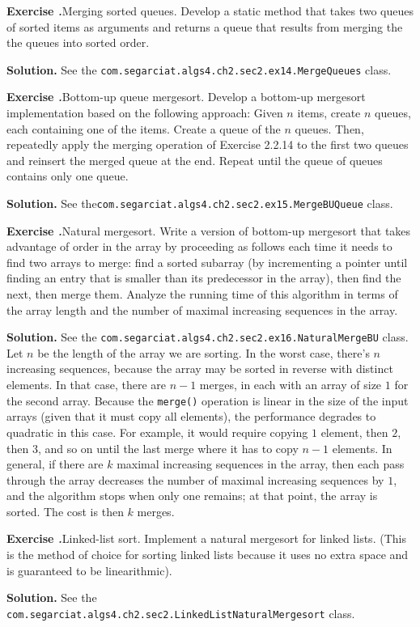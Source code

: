 \documentclass[12pt, a4paper]{article}
\newenvironment{ex}[2][Exercise]
{\par\medskip\noindent \textbf{#1 #2.}}
{\medskip}
\newenvironment{sol}[1][Solution]
{\par\medskip\noindent \textbf{#1.} }
{\medskip}
\begin{document}
	\begin{ex}{14}
		\emph{Merging sorted queues}. Develop a static method that takes two queues of sorted
		items as arguments and returns a queue that results from merging the the queues
		into sorted order.
	\end{ex}
	\begin{sol}
		See the \texttt{com.segarciat.algs4.ch2.sec2.ex14.MergeQueues} class.
	\end{sol}
	\begin{ex}{15}
		\emph{Bottom-up queue mergesort}. Develop a bottom-up mergesort implementation based
		on the following approach: Given $n$ items, create $n$ queues, each containing one
		of the items. Create a queue of the $n$ queues. Then, repeatedly apply the merging
		operation of Exercise 2.2.14 to the first two queues and reinsert the merged queue
		at the end. Repeat until the queue of queues contains only one queue.
	\end{ex}
	\begin{sol}
		See the\texttt{com.segarciat.algs4.ch2.sec2.ex15.MergeBUQueue} class.
	\end{sol}
	\begin{ex}{16}
		\emph{Natural mergesort}. Write a version of bottom-up mergesort that takes advantage
		of order in the array by proceeding as follows each time it needs to find
		two arrays to merge: find a sorted subarray (by incrementing a pointer until
		finding an entry that is smaller than its predecessor in the array), then find
		the next, then merge them. Analyze the running time of this algorithm in terms
		of the array length and the number of maximal increasing sequences in the array.
	\end{ex}
	\begin{sol}
		See the \texttt{com.segarciat.algs4.ch2.sec2.ex16.NaturalMergeBU} class.
		Let $n$ be the length of the array we are sorting. In the worst case,
		there's $n$ increasing sequences, because the array may be sorted in
		reverse with distinct elements. In that case, there are $n-1$ merges,
		in each with an array of size $1$ for the second array.
		Because the \texttt{merge()} operation is linear in the size of the
		input arrays (given that it must copy all elements), the performance
		degrades to quadratic in this case. For example, it would require copying
		$1$ element, then $2$, then $3$, and so on until the last merge where
		it has to copy $n-1$ elements. In general, if there are $k$ maximal increasing
		sequences in the array, then each pass through the array decreases the number
		of maximal increasing sequences by $1$, and the algorithm stops when only
		one remains; at that point, the array is sorted. The cost is then $k$ merges.
	\end{sol}
	\begin{ex}{17}
		\emph{Linked-list sort}. Implement a natural mergesort for linked lists. (This is the
		method of choice for sorting linked lists because it uses no extra space and
		is guaranteed to be linearithmic).
	\end{ex}
	\begin{sol}
		See the \texttt{com.segarciat.algs4.ch2.sec2.LinkedListNaturalMergesort} class.
	\end{sol}
	\pagebreak
	\printbibliography
\end{document}
